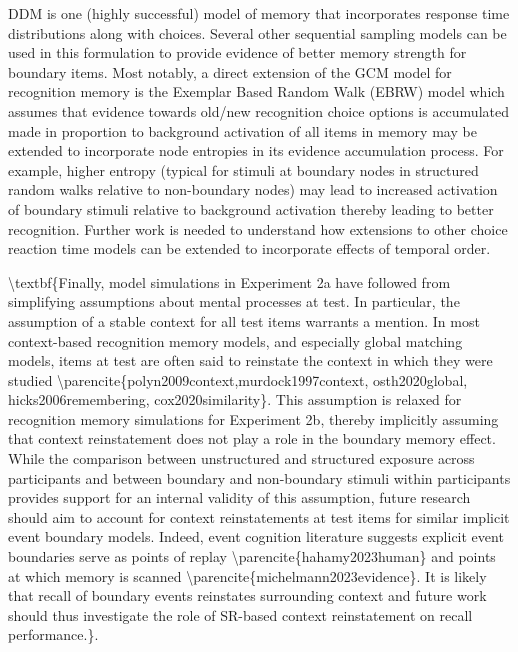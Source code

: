 DDM is one (highly successful) model of memory that incorporates response time distributions along with choices. Several other sequential sampling models can be used in this formulation to provide evidence of better memory strength for boundary items. Most notably, a direct extension of the GCM model for recognition memory is the Exemplar Based Random Walk (EBRW) model \parencite{nosofsky2011short} which assumes that evidence towards old/new recognition choice options is accumulated made in proportion to background activation of all items in memory may be extended to incorporate node entropies in its evidence accumulation process. For example, higher entropy (typical for stimuli at boundary nodes in structured random walks relative to non-boundary nodes) may lead to increased activation of boundary stimuli relative to background activation thereby leading to better recognition. Further work is needed to understand how extensions to other choice reaction time models can be extended to incorporate effects of temporal order.


\ac{\textbf{Finally, model simulations in Experiment 2a have followed from simplifying assumptions about mental processes at test. In particular, the assumption of a stable context for all test items warrants a mention. In most context-based recognition memory models, and especially global matching models, items at test are often said to reinstate the context in which they were studied \parencite{polyn2009context,murdock1997context, osth2020global, hicks2006remembering, cox2020similarity}. This assumption is relaxed for recognition memory simulations for Experiment 2b, thereby implicitly assuming that context reinstatement does not play a role in the boundary memory effect. While the comparison between unstructured and structured exposure across participants and between boundary and non-boundary stimuli within participants provides support for an internal validity of this assumption, future research should aim to account for context reinstatements at test items for similar implicit event boundary models. Indeed, event cognition literature suggests explicit event boundaries serve as points of replay \parencite{hahamy2023human} and points at which memory is scanned \parencite{michelmann2023evidence}. It is likely that recall of boundary events reinstates surrounding context and future work should thus investigate the role of SR-based context reinstatement on recall performance.}}. 

